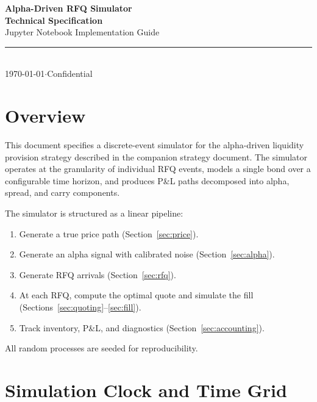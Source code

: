 \documentclass[11pt,a4paper]{article}
\begin{document}
\begin{center}
{\Huge\bfseries\color{navy} Alpha-Driven RFQ Simulator\\[0.3em] Technical Specification}\\[1em]
{\large\color{steel} Jupyter Notebook Implementation Guide}\\[0.5em]
{\color{steel}\rule{0.4\textwidth}{0.4pt}}\\[0.5em]
{\color{steel}\today \quad$\cdot$\quad Confidential}
\end{center}

\vspace{0.5em}
\tableofcontents
\newpage


\section{Overview}

This document specifies a discrete-event simulator for the alpha-driven liquidity provision strategy described in the companion strategy document. The simulator operates at the granularity of individual RFQ events, models a single bond over a configurable time horizon, and produces P\&L paths decomposed into alpha, spread, and carry components.

The simulator is structured as a linear pipeline:

\begin{enumerate}[leftmargin=2em]
  \item Generate a true price path (Section~\ref{sec:price}).
  \item Generate an alpha signal with calibrated noise (Section~\ref{sec:alpha}).
  \item Generate RFQ arrivals (Section~\ref{sec:rfq}).
  \item At each RFQ, compute the optimal quote and simulate the fill (Sections~\ref{sec:quoting}--\ref{sec:fill}).
  \item Track inventory, P\&L, and diagnostics (Section~\ref{sec:accounting}).
\end{enumerate}

All random processes are seeded for reproducibility.


\section{Simulation Clock and Time Grid}
\end{document}

